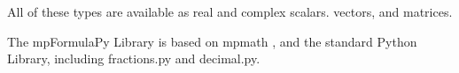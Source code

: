 All of these types are available as real and complex scalars. vectors, and matrices.

\vpara
The mpFormulaPy Library is based on mpmath \cite{mpmath}, and the standard Python Library, including fractions.py and decimal.py.
%	
%
%
%	
%	
